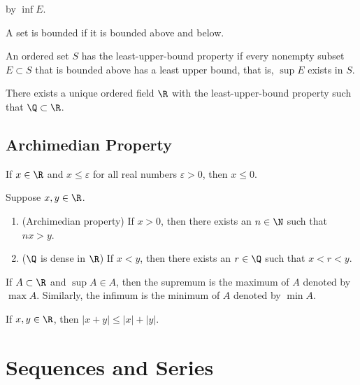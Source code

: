 \documentclass[12pt]{article}
\begin{document}
by \(\inf E\).
\begin{definition}
    A set is bounded if it is bounded above and below.
\end{definition}
\begin{definition}
    An ordered set \(S\) has the least-upper-bound property if every
    nonempty subset \(E\subset S\) that is bounded above has a least upper
    bound, that is, \(\sup E\) exists in \(S\).
\end{definition}
\begin{theorem}
    There exists a unique ordered field \(\R\) with the least-upper-bound
    property such that \(\Q\subset\R\).
\end{theorem}

\subsection{Archimedian Property}
\begin{theorem}
    If \(x\in\R\) and \(x\leq\varepsilon\) for all real numbers
    \(\varepsilon>0\), then \(x\leq0\).
\end{theorem}
\begin{theorem}
    Suppose \(x,y\in\R\).
    \begin{enumerate}
        \item (Archimedian property) If \(x>0\), then there exists an
        \(n\in\N\) such that \(nx>y\).
        \item (\(\Q\) is dense in \(\R\)) If \(x<y\), then there exists an
        \(r\in\Q\) such that \(x<r<y\).
    \end{enumerate}
\end{theorem}
If \(A\subset\R\) and \(\sup A\in A\), then the supremum is the
maximum of \(A\) denoted by \(\max A\).
Similarly, the infimum is the minimum of \(A\) denoted by \(\min A\).
\begin{theorem}
    If \(x,y\in\R\), then \(|x+y|\leq|x|+|y|\).
\end{theorem}

\section{Sequences and Series}
\end{document}
